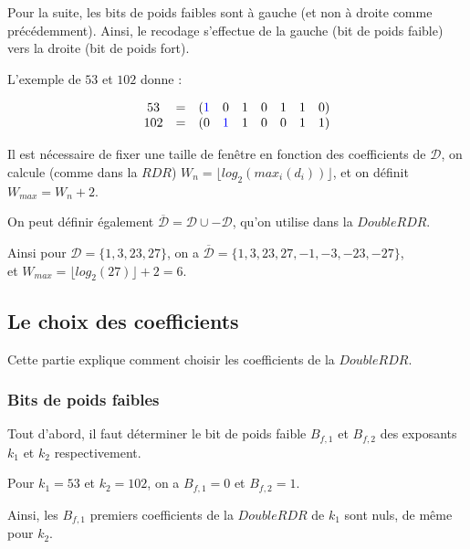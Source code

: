 \documentclass[12pt, a4paper]{memoir}
\newcommand{\dbarre}{\overline{\mathcal{D}}}
\begin{document}
 
 Pour la suite, les bits de poids faibles sont à gauche (et non à droite comme précédemment).
 Ainsi, le recodage s'effectue de la gauche (bit de poids faible) vers la droite (bit de poids fort).
 
 L'exemple de $53$ et $102$ donne :
 
  $$\begin{array}{ccccccccc}
  53 & = & (\textcolor{blue}{1} & 0 & 1 & 0 & 1 & 1 & 0) \\
  102 & = & (0 & \textcolor{blue}{1} & 1 & 0 & 0 & 1 & 1)
 \end{array}$$
 
   Il est nécessaire de fixer une taille de fenêtre en fonction des coefficients de $\mathcal{D}$, on calcule
   (comme dans la $RDR$) $W_n = \lfloor log_2(max_i(d_i)) \rfloor$, et on définit $W_{max} = W_n + 2$.
   
   On peut définir également $\dbarre = \mathcal{D} \cup -\mathcal{D}$, qu'on utilise dans la $DoubleRDR$.

   Ainsi pour $\mathcal{D} = \{1,3,23,27\}$, on a $\dbarre = \{1,3,23,27,-1,-3,-23,-27\}$, \\
   et $W_{max} = \lfloor log_2(27) \rfloor + 2 = 6$.

 
 \subsection{Le choix des coefficients}

 Cette partie explique comment choisir les coefficients de la $DoubleRDR$.
 
 \subsubsection{Bits de poids faibles}
 
 Tout d'abord, il faut déterminer le  bit de poids faible $B_{f,1}$ et $B_{f,2}$ des exposants $k_1$ et $k_2$ 
 respectivement. 
 
 Pour $k_1 = 53$ et $k_2 = 102$, on a $B_{f,1} = 0$ et $B_{f,2} = 1$.
 
 Ainsi, les $B_{f,1}$ premiers coefficients de la $DoubleRDR$ de $k_1$ sont nuls, de même pour $k_2$.
 
\end{document}
